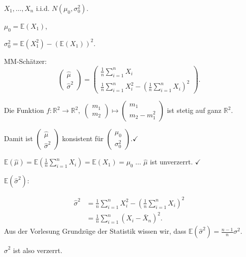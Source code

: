 \documentclass{tstextbook}
\newcommand{\E}{\mathbb E}
\newcommand{\R}{\mathbb R}
\begin{document}
\begin{example}[Normalverteilung]
	
	$ X_1, \ldots, X_n $ i.i.d. $ N\left(\mu_0, \sigma_0^2\right) $.
	
	$ \mu_0 = \E(X_1) $, 
	
	$ \sigma_0^2 = \E(X_1^2) - (\E(X_1))^2 $.
	
	MM-Schätzer: 
	\[
	\begin{pmatrix}
		\hat{\mu} \\ \hat{\sigma}^2 
	\end{pmatrix} 
	= \begin{pmatrix}
		\frac{1}{n} \sum_{i=1}^{n} X_i \\
		\frac{1}{n} \sum_{i=1}^{n} X_i^2 - \left(\frac{1}{n} \sum_{i=1}^{n} X_i\right)^2
	\end{pmatrix}.
	\]
	
	Die Funktion $ f \colon \R^2 \rightarrow \R^2, \; \begin{pmatrix} m_1 \\ m_2 \end{pmatrix} \mapsto \begin{pmatrix} m_1 \\ m_2-m_1^2 \end{pmatrix} $ ist stetig auf ganz $ \R^2 $. 
	
	Damit ist $ \begin{pmatrix} \hat{\mu} \\ \hat{\sigma}^2 \end{pmatrix} $ konsistent für $ \begin{pmatrix} \mu_0 \\ \sigma_0^2 \end{pmatrix} . \checkmark $
	
	$ \E(\hat{\mu}) = \E\left(\frac{1}{n} \sum_{i=1}^{n} X_i \right) = \E(X_1) = \mu_0 \; \ldots $ $ \hat{\mu} $ ist unverzerrt. $ \checkmark $
	
	$ \E(\hat{\sigma}^2): $ 
	
	\[
	\begin{aligned}
		\hat{\sigma}^2 & = \frac{1}{n} \sum_{i=1}^{n} X_i^2 - \left(\frac{1}{n} \sum_{i=1}^{n} X_i\right)^2 \\
		& = \frac{1}{n} \sum_{i=1}^{n} \left(X_i- \bar{X}_n \right)^2.
	\end{aligned}                      
	\]
	Aus der Vorlesung Grundzüge der Statistik wissen wir, dass 
	$ \E(\hat{\sigma}^2) = \frac{n-1}{n} \sigma^2 $. 
	
	$ \hat{\sigma}^2 $ ist also verzerrt. 
\end{example}
\end{document}
